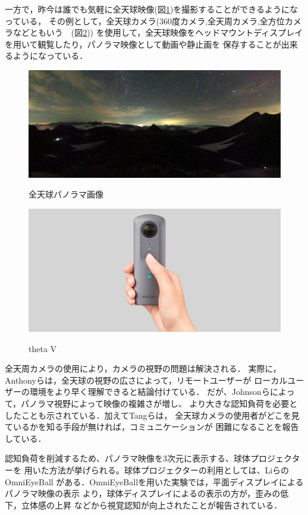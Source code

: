 一方で，昨今は誰でも気軽に全天球映像(図\ref{fig:2})を撮影することができるようになっている，
その例として，全天球カメラ(360度カメラ,全天周カメラ,全方位カメラなどともいう　(図\ref{fig:3}))
を使用して，全天球映像をヘッドマウントディスプレイを用いて観覧したり，パノラマ映像として動画や静止画を
保存することが出来るようになっている．
\begin{figure}[tbp]
  \centering
  \includegraphics[scale=0.6]{fig/panorama.png}
  \caption{全天球パノラマ画像}\label{fig:2}\cite{4}
\end{figure}
\begin{figure}[tbp]
  \centering
  \includegraphics[scale=0.2]{fig/thetaV.png}
  \caption{theta V}\label{fig:3}\cite{4}
\end{figure}

全天周カメラの使用により，カメラの視野の問題は解決される．
実際に，Anthonyら\cite{5}は，全天球の視野の広さによって，リモートユーザーが
ローカルユーザーの環境をより早く理解できると結論付けている．
だが、Johnsonら\cite{6}によって，パノラマ視野によって映像の複雑さが増し、
より大きな認知負荷を必要としたことも示されている．加えてTangら\cite{19}は，
全天球カメラの使用者がどこを見ているかを知る手段が無ければ，コミュニケーションが
困難になることを報告している．

認知負荷を削減するため、パノラマ映像を3次元に表示する、球体プロジェクター\cite{15}を
用いた方法が挙げられる。球体プロジェクターの利用としては、LiらのOmniEyeBall\cite{18}\cite{24}
がある．OmniEyeBallを用いた実験では，平面ディスプレイによるパノラマ映像の表示
より，球体ディスプレイによるの表示の方が，歪みの低下，立体感の上昇
などから視覚認知が向上されたことが報告されている．

